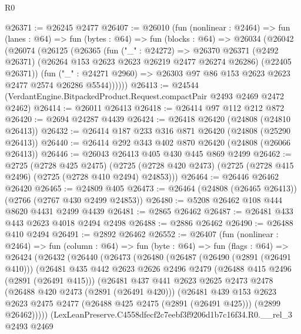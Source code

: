 \begin{lexlean}{R0}
\begin{coremodule}
@26371 := @26245 @2477
@26407 := @26010
    (fun (nonlinear : @2464) =>
    fun (lanes : @64) =>
    fun (bytes : @64) =>
    fun (blocks : @64) =>
    @26034
      (@26042
        (@26074
          (@26125
            (@26365
              (fun ("_" : @24272) =>
              @26370
                @26371
                (@2492 @26371)
                (@26264 @153 @2623 @2623 @26219 @2477 @26274 @26286)
                (@22405 @26371))
              (fun ("_" : @24271 @2960) =>
              @26303 @97 @86 @153 @2623 @2623 @2477 @2574 @26286 @5544))))))
@26413 := @24544 (VerdantEngine.BitpackedProduct.Request.compactPair @2493 @2469 @2472 @2462)
@26414 := @26011 @26413
@26418 := @26414 @97 @112 @212 @872
@26420 := @2694 @24287 @4439
@26424 := @26418 @26420 (@24808 (@24810 @26413))
@26432 := @26414 @187 @233 @316 @871 @26420 (@24808 (@25290 @26413))
@26440 := @26414 @292 @343 @402 @870 @26420 (@24808 (@26066 @26413))
@26446 := @26043 @26413 @405 @430 @445 @869 @2499
@26462 := @2725
    (@2728 @425 @2475)
    (@2725 (@2728 @420 @2473) (@2725 (@2728 @415 @2496) (@2725 (@2728 @410 @2494) @24853)))
@26464 := @26446 @26462 @26420
@26465 := @24809 @405
@26473 := @26464 (@24808 (@26465 @26413)) (@2766 (@2767 @430 @2499 @24853))
@26480 := @5208 @26462 @108 @444 @8620 @4431 @2499 @4439
@26481 := @2865 @26462
@26487 := @26481 @433 @443 @2623 @4018 @2494 @2498
@26488 := @2886 @26462
@26490 := @26488 @410 @2494
@26491 := @2892 @26462
@26552 := @26407
    (fun (nonlinear : @2464) =>
    fun (column : @64) =>
    fun (byte : @64) =>
    fun (flags : @64) =>
    @26424
      (@26432
        (@26440
          (@26473
            (@26480
              (@26487
                (@26490 (@2891 (@26491 @410)))
                (@26481
                  @435
                  @442
                  @2623
                  @2626
                  @2496
                  @2479
                  (@26488 @415 @2496 (@2891 (@26491 @415)))
                  (@26481
                    @437
                    @441
                    @2623
                    @2625
                    @2473
                    @2478
                    (@26488 @420 @2473 (@2891 (@26491 @420)))
                    (@26481
                      @439
                      @153
                      @2623
                      @2623
                      @2475
                      @2477
                      (@26488 @425 @2475 (@2891 (@26491 @425)))
                      (@2899 @26462)))))
              (LexLeanPreserve.C4558dfecf2c7eebf3f9206d1b7c16f34.R0.__rel_3
                @2493
                @2469

\end{coremodule}
\end{lexlean}
